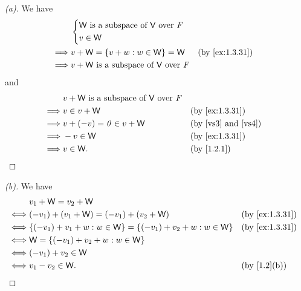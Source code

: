 \begin{proof}[(a)]
	We have
	\begin{align*}
		         & \begin{dcases}
			           \W \text{ is a subspace of } \V \text{ over } \F \\
			           v \in \W
		           \end{dcases}                         \\
		\implies & v + \W = \set{v + w : w \in \W} = \W                 &  & \by{ex:1.3.31} \\
		\implies & v + \W \text{ is a subspace of } \V \text{ over } \F
	\end{align*}
	and
	\begin{align*}
		         & v + \W \text{ is a subspace of } \V \text{ over } \F                                          \\
		\implies & v \in v + \W                                         &  & \by{ex:1.3.31}                      \\
		\implies & v + (-v) = \zv \in v + \W                            &  & \text{(by \ref{vs3} and \ref{vs4})} \\
		\implies & -v \in \W                                            &  & \by{ex:1.3.31}                      \\
		\implies & v \in \W.                                            &  & \by{1.2.1}
	\end{align*}
\end{proof}

\begin{proof}[(b)]
	We have
	\begin{align*}
		     & v_1 + \W = v_2 + \W                                                                       \\
		\iff & (-v_1) + (v_1 + \W) = (-v_1) + (v_2 + \W)                             &  & \by{ex:1.3.31} \\
		\iff & \set{(-v_1) + v_1 + w : w \in \W} = \set{(-v_1) + v_2 + w : w \in \W} &  & \by{ex:1.3.31} \\
		\iff & \W = \set{(-v_1) + v_2 + w : w \in \W}                                                    \\
		\iff & (-v_1) + v_2 \in \W                                                                       \\
		\iff & v_1 - v_2 \in \W.                                                     &  & \by{1.2}[b]
	\end{align*}
\end{proof}


